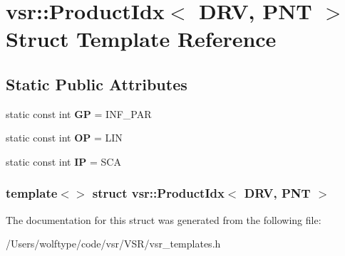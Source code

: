 \hypertarget{structvsr_1_1_product_idx_3_01_d_r_v_00_01_p_n_t_01_4}{\section{vsr\-:\-:Product\-Idx$<$ D\-R\-V, P\-N\-T $>$ Struct Template Reference}
\label{structvsr_1_1_product_idx_3_01_d_r_v_00_01_p_n_t_01_4}
}
\subsection*{Static Public Attributes}
\begin{DoxyCompactItemize}
\item 
\hypertarget{structvsr_1_1_product_idx_3_01_d_r_v_00_01_p_n_t_01_4_a35d56bb7ec79a1dd307d3df569ce9bc6}{static const int {\bfseries G\-P} = I\-N\-F\-\_\-\-P\-A\-R}\label{structvsr_1_1_product_idx_3_01_d_r_v_00_01_p_n_t_01_4_a35d56bb7ec79a1dd307d3df569ce9bc6}

\item 
\hypertarget{structvsr_1_1_product_idx_3_01_d_r_v_00_01_p_n_t_01_4_a9fd9bd840b58d8d255ed982dd930ea08}{static const int {\bfseries O\-P} = L\-I\-N}\label{structvsr_1_1_product_idx_3_01_d_r_v_00_01_p_n_t_01_4_a9fd9bd840b58d8d255ed982dd930ea08}

\item 
\hypertarget{structvsr_1_1_product_idx_3_01_d_r_v_00_01_p_n_t_01_4_aa3a0dbbde5c768a4f0c80e3918bc45fe}{static const int {\bfseries I\-P} = S\-C\-A}\label{structvsr_1_1_product_idx_3_01_d_r_v_00_01_p_n_t_01_4_aa3a0dbbde5c768a4f0c80e3918bc45fe}

\end{DoxyCompactItemize}
\subsubsection*{template$<$$>$ struct vsr\-::\-Product\-Idx$<$ D\-R\-V, P\-N\-T $>$}



The documentation for this struct was generated from the following file\-:\begin{DoxyCompactItemize}
\item 
/\-Users/wolftype/code/vsr/\-V\-S\-R/vsr\-\_\-templates.\-h\end{DoxyCompactItemize}

